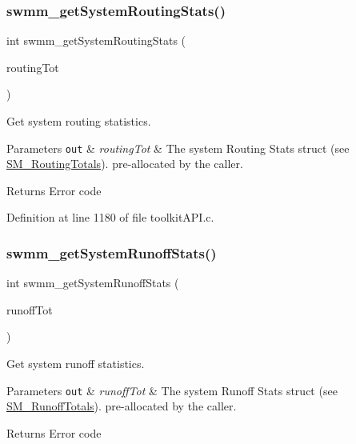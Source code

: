 \subsubsection{\texorpdfstring{swmm\+\_\+get\+System\+Routing\+Stats()}{swmm\_getSystemRoutingStats()}}
{\footnotesize\ttfamily int swmm\+\_\+get\+System\+Routing\+Stats (\begin{DoxyParamCaption}\item[{\hyperlink{struct_s_m___routing_totals}{S\+M\+\_\+\+Routing\+Totals} $\ast$}]{routing\+Tot }\end{DoxyParamCaption})}



Get system routing statistics. 


\begin{DoxyParams}[1]{Parameters}
\mbox{\tt out}  & {\em routing\+Tot} & The system Routing Stats struct (see \hyperlink{struct_s_m___routing_totals}{S\+M\+\_\+\+Routing\+Totals}). pre-\/allocated by the caller. \\
\hline
\end{DoxyParams}
\begin{DoxyReturn}{Returns}
Error code 
\end{DoxyReturn}


Definition at line 1180 of file toolkit\+A\+P\+I.\+c.

\mbox{\label{group__tkfuncs_gabf3ea290e2af763289e18db435ea2ccd}} 
\subsubsection{\texorpdfstring{swmm\+\_\+get\+System\+Runoff\+Stats()}{swmm\_getSystemRunoffStats()}}
{\footnotesize\ttfamily int swmm\+\_\+get\+System\+Runoff\+Stats (\begin{DoxyParamCaption}\item[{\hyperlink{struct_s_m___runoff_totals}{S\+M\+\_\+\+Runoff\+Totals} $\ast$}]{runoff\+Tot }\end{DoxyParamCaption})}



Get system runoff statistics. 


\begin{DoxyParams}[1]{Parameters}
\mbox{\tt out}  & {\em runoff\+Tot} & The system Runoff Stats struct (see \hyperlink{struct_s_m___runoff_totals}{S\+M\+\_\+\+Runoff\+Totals}). pre-\/allocated by the caller. \\
\hline
\end{DoxyParams}
\begin{DoxyReturn}{Returns}
Error code 
\end{DoxyReturn}


